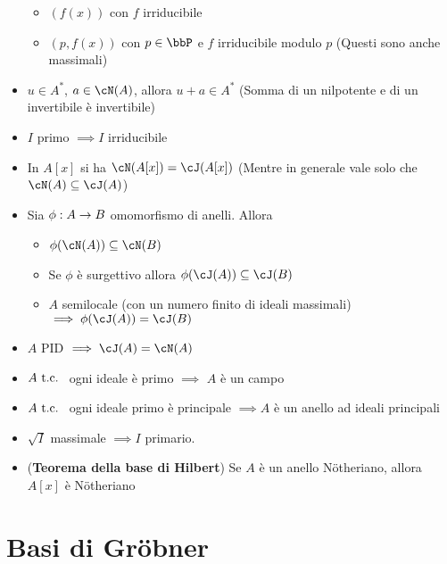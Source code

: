 \documentclass[a4paper,NoNotes,GeneralMath]{stdmdoc}
\begin{document}
\begin{itemize}
\begin{itemize}
				\item $(f(x))$ con $f$ irriducibile
				\item $(p, f(x))$ con $p \in \bbP$ e $f$ irriducibile modulo $p$ (Questi sono anche massimali)
			\end{itemize}
		\item $u \in A^*$, $a \in \cN(A)$, allora $u + a \in A^*$ (Somma di un nilpotente e di un invertibile è invertibile)
		\item $I$ primo $\implies I $ irriducibile
		\item In $A[x]$ si ha $\cN(A[x]) = \cJ(A[x])$ (Mentre in generale vale solo che $\cN(A) \subseteq \cJ(A)$)
		\item Sia $\phi: A \rightarrow B$ omomorfismo di anelli. Allora
			\begin{itemize}
				\item $\phi(\cN(A)) \subseteq \cN(B)$
				\item Se $\phi$ è surgettivo allora $\phi(\cJ(A)) \subseteq \cJ(B)$
				\item $A$ semilocale (con un numero finito di ideali massimali) $\implies \phi(\cJ(A)) = \cJ(B)$
			\end{itemize}
		\item $A$ PID $\implies \cJ(A) = \cN(A)$
		\item $A \mbox{ t.c. }$ ogni ideale è primo $\implies$ $A$ è un campo
		\item $A \mbox{ t.c. }$ ogni ideale primo è principale $\implies A$ è un anello ad ideali principali
		\item $\sqrt{I}$ massimale $\implies I$ primario.
		\item ({\bf Teorema della base di Hilbert}) Se $A$ è un anello Nötheriano, allora $A[x]$ è Nötheriano
	\end{itemize}
	
	\section*{Basi di Gröbner}
\end{document}
